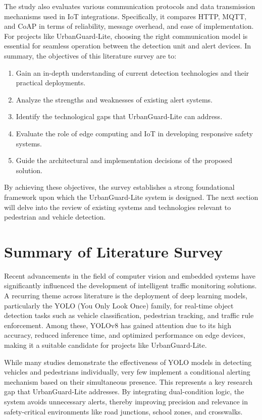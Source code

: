 \documentclass[a4paper, 12pt]{report}
\begin{document}
The study also evaluates various communication protocols and data transmission mechanisms used in IoT integrations. Specifically, it compares HTTP, MQTT, and CoAP in terms of reliability, message overhead, and ease of implementation. For projects like UrbanGuard-Lite, choosing the right communication model is essential for seamless operation between the detection unit and alert devices. In summary, the objectives of this literature survey are to:
\begin{enumerate}[itemsep=-4pt, label=\roman*.]
    \item Gain an in-depth understanding of current detection technologies and their practical deployments.
    
    \item  Analyze the strengths and weaknesses of existing alert systems.
    \item Identify the technological gaps that UrbanGuard-Lite can address.
    \item Evaluate the role of edge computing and IoT in developing responsive safety systems.
    \item Guide the architectural and implementation decisions of the proposed solution.
    
\end{enumerate}
By achieving these objectives, the survey establishes a strong foundational framework upon which the UrbanGuard-Lite system is designed. The next section will delve into the review of existing systems and technologies relevant to pedestrian and vehicle detection.

\section{Summary of Literature Survey}

Recent advancements in the field of computer vision and embedded systems have significantly influenced the development of intelligent traffic monitoring solutions. A recurring theme across literature is the deployment of deep learning models, particularly the YOLO (You Only Look Once) family, for real-time object detection tasks such as vehicle classification, pedestrian tracking, and traffic rule enforcement. Among these, YOLOv8 has gained attention due to its high accuracy, reduced inference time, and optimized performance on edge devices, making it a suitable candidate for projects like UrbanGuard-Lite.

While many studies demonstrate the effectiveness of YOLO models in detecting vehicles and pedestrians individually, very few implement a conditional alerting mechanism based on their simultaneous presence. This represents a key research gap that UrbanGuard-Lite addresses. By integrating dual-condition logic, the system avoids unnecessary alerts, thereby improving precision and relevance in safety-critical environments like road junctions, school zones, and crosswalks.
\end{document}
